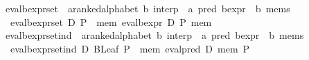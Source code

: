 \begin{isabellebody}
\isanewline
{}\isamarkupfalse%
\ eval{}bexpr{}set\ {}{}\ {}{}{}a{}{}ranked{}alphabet{}\ {}b{}\ interp\ {}\ {}a\ pred\ bexpr\ {}\ {}b\ mems{}\ \isanewline
\ \ {}eval{}bexpr{}set\ D\ P\ {}\ {}mem{}\ eval{}bexpr\ D\ P\ mem{}{}\isanewline
\isanewline
{}\isamarkupfalse%
\ eval{}bexpr{}set{}ind\ {}{}\ {}{}{}a{}{}ranked{}alphabet{}\ {}b{}\ interp\ {}\ {}a\ pred\ bexpr\ {}\ {}b\ mems{}\ \isanewline
\ \ {}eval{}bexpr{}set{}ind\ D\ {}BLeaf\ P{}\ {}\ {}mem{}\ eval{}pred\ D\ mem\ P{}{}\isanewline

\end{isabellebody}
